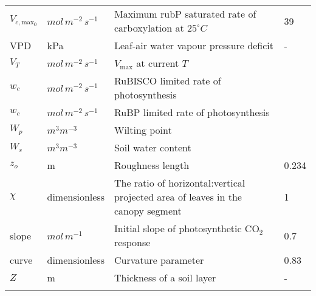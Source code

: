 \documentclass[10pt]{article}
\renewcommand{\marginnote}[2][]{}
\begin{document}
\begin{center}
\begin{longtable}{l l p{3in} p{0.5in}}
$V_{c,\text{max}_0}$	&	$mol\, m^{-2}\, s^{-1}$ 	&	Maximum rubP saturated rate of carboxylation at $25^\circ C$	&	39	\\
VPD	&	kPa	&	Leaf-air water vapour pressure deficit	&	-	\\
$V_T$ & $mol\, m^{-2}\, s^{-1}$  &$V_\text{max}$ at current $T$ & \\
$w_c$ & 	$mol\, m^{-2}\, s^{-1}$\marginnote{units?} & RuBISCO limited rate of photosynthesis & \\
$w_c$ & 	$mol\, m^{-2}\, s^{-1}$\marginnote{units?} & RuBP limited rate of photosynthesis & \\
$W_p$ & $m^3m^{-3}$ & Wilting point & \\
$W_s$ & $m^3m^{-3}$ & Soil water content & \\
$z_o$	&	m	&	Roughness length	&	0.234	\\
$\chi$	&	dimensionless	&	The ratio of horizontal:vertical projected area of leaves in the canopy segment	&	1	\\
slope	&	$mol\, m^{-1}$ 	&	Initial slope of photosynthetic CO$_2$ response	&	0.7	\\
curve	&	dimensionless	&	Curvature parameter	&	0.83	\\
$Z$	&	m	&	Thickness of a soil layer	&	-	\\
\\
\end{longtable}
\end{center}
\end{document}
